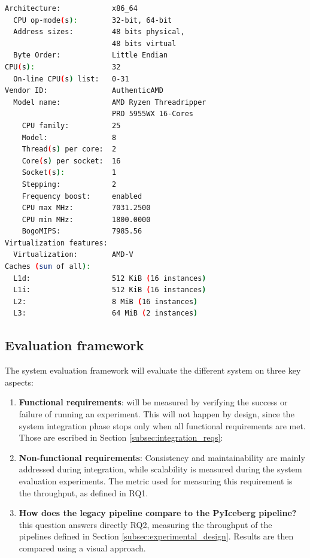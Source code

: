 \begin{lstlisting}[language=bash, caption={[Experimental environment details]Output of a \textit{lscpu} bash command on the machine.}, label={lst:cpu_snurran}, frame=tb, basicstyle=\small]
Architecture:            x86_64
  CPU op-mode(s):        32-bit, 64-bit
  Address sizes:         48 bits physical, 
                         48 bits virtual
  Byte Order:            Little Endian
CPU(s):                  32
  On-line CPU(s) list:   0-31
Vendor ID:               AuthenticAMD
  Model name:            AMD Ryzen Threadripper 
                         PRO 5955WX 16-Cores
    CPU family:          25
    Model:               8
    Thread(s) per core:  2
    Core(s) per socket:  16
    Socket(s):           1
    Stepping:            2
    Frequency boost:     enabled
    CPU max MHz:         7031.2500
    CPU min MHz:         1800.0000
    BogoMIPS:            7985.56
Virtualization features: 
  Virtualization:        AMD-V
Caches (sum of all):     
  L1d:                   512 KiB (16 instances)
  L1i:                   512 KiB (16 instances)
  L2:                    8 MiB (16 instances)
  L3:                    64 MiB (2 instances)
\end{lstlisting}



\subsection{Evaluation framework}
\label{subsec:method_eval_framework_hudi_iceberg}

The system evaluation framework will evaluate the different system on three key aspects:
\begin{enumerate}
    \item \textbf{Functional requirements}: will be measured by verifying the success or failure of running an experiment. This will not happen by design, since the system integration phase stops only when all functional requirements are met. Those are escribed in Section \ref{subsec:integration_reqs}:
    \item \textbf{Non-functional requirements}: Consistency and maintainability are mainly addressed during integration, while scalability is measured during the system evaluation experiments. The metric used for measuring this requirement is the throughput, as defined in \gls{RQ}1.
    \item \textbf{How does the legacy pipeline compare to the PyIceberg pipeline?} this question answers directly \gls{RQ}2, measuring the throughput of the pipelines defined in Section \ref{subsec:experimental_design}. Results are then compared using a visual approach.
\end{enumerate} 



